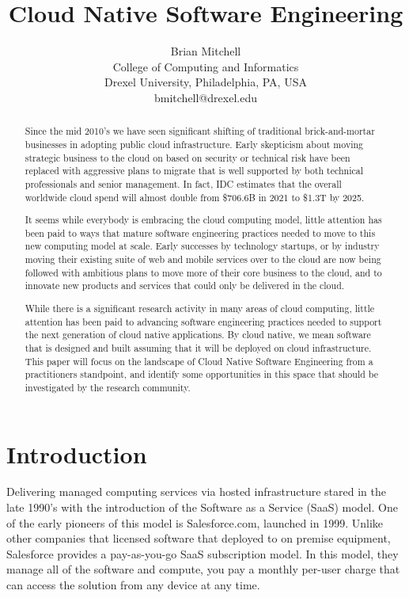 \documentclass[conference]{IEEEconf}
\title{ 
        	Cloud Native Software Engineering 
      }
\author{
			Brian Mitchell\\
			College of Computing and Informatics\\
			Drexel University, Philadelphia, PA, USA\\
			bmitchell@drexel.edu
}
\date{}
\begin{document}
%

\maketitle

\thispagestyle{empty}


\begin{abstract}
Since the mid 2010's we have seen significant shifting of traditional brick-and-mortar businesses in adopting public cloud infrastructure.  Early skepticism about moving strategic business to the cloud on based on security or technical risk have been replaced with aggressive plans to migrate that is well supported by both technical professionals and senior management. In fact, IDC estimates that the overall worldwide cloud spend will almost double from \$706.6B in 2021 to \$1.3T by 2025\cite{IDCReport}.  

It seems while everybody is embracing the cloud computing model, little attention has been paid to ways that mature software engineering practices needed to move to this new computing model at scale. Early successes by technology startups, or by industry moving their existing suite of web and mobile services over to the cloud are now being followed with ambitious plans to move more of their core business to the cloud, and to innovate new products and services that could only be delivered in the cloud.

While there is a significant research activity in many areas of cloud computing, little attention has been paid to advancing software engineering practices needed to support the next generation of cloud native applications.  By cloud native, we mean software that is designed and built assuming that it will be deployed on cloud infrastructure. This paper will focus on the landscape of Cloud Native Software Engineering from a practitioners standpoint, and  identify some opportunities in this space that should be investigated by the research community.
\end{abstract}  



\section{Introduction}
\label{Intro}

Delivering managed computing services via hosted infrastructure stared in the late 1990's with the introduction of the Software as a Service (SaaS) model. One of the early pioneers of this model is Salesforce.com, launched in 1999\cite{SalesforceHistory}.  Unlike other companies that licensed software that deployed to on premise equipment, Salesforce provides a pay-as-you-go SaaS subscription model. In this model, they manage all of the software and compute, you pay a monthly per-user charge that can access the solution from any device at any time.     
\end{document}
